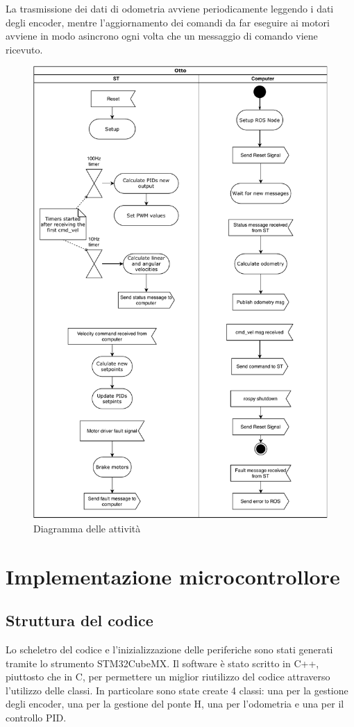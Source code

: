 La trasmissione dei dati di odometria avviene periodicamente leggendo i dati degli encoder, mentre l'aggiornamento dei comandi da far eseguire ai motori avviene in modo asincrono ogni volta che un messaggio di comando viene ricevuto.


\begin{figure}[H]
    \centering
    \includegraphics[scale=0.84]{images/uml_activities.pdf}
    \caption{Diagramma delle attività}
\end{figure}
\newpage

\section{Implementazione microcontrollore}
\subsection{Struttura del codice}
Lo scheletro del codice e l'inizializzazione delle periferiche sono stati generati tramite lo strumento STM32CubeMX. 
Il software è stato scritto in C++, piuttosto che in C, per permettere un miglior riutilizzo del codice attraverso l'utilizzo delle classi. In particolare sono state create 4 classi: una per la gestione degli encoder, una per la gestione del ponte H, una per l'odometria e una per il controllo PID.

